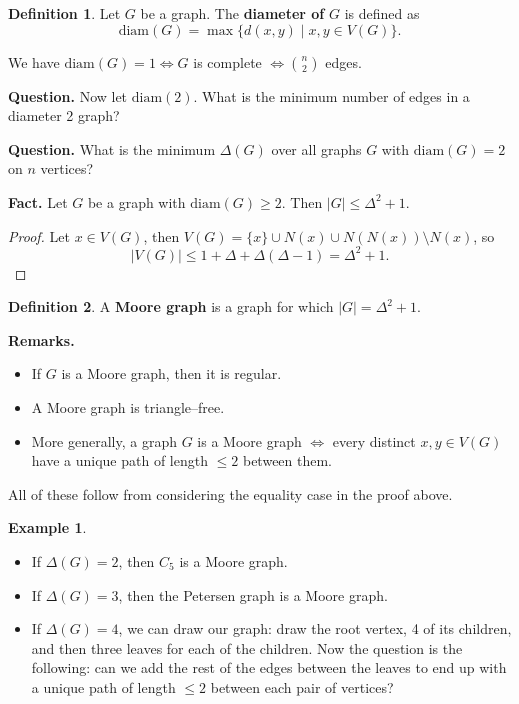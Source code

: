 \documentclass{article}
\theoremstyle{definition}
\newtheorem{example}{Example}[section]
\newtheorem{defn}{Definition}[section]
\begin{document}
\begin{defn}
    Let $G$ be a graph. The \textbf{diameter of} $G$ is defined as $$\text{diam}(G) = \max \{d(x,y) \mid x,y \in V(G)\}.$$ 
\end{defn}

We have $\text{diam}(G)=1 \iff G$ is complete $\iff {n\choose{2}}$ edges.
\vspace{1mm}

\textbf{Question.} Now let $\text{diam}(2)$. What is the minimum number of edges in a diameter 2 graph?
\vspace{1mm}

\textbf{Question.} What is the minimum $\Delta(G)$ over all graphs $G$ with $\text{diam}(G)=2$ on $n$ vertices?
\vspace{1mm}

\textbf{Fact.} Let $G$ be a graph with $\text{diam}(G)\ge 2$. Then $|G| \le \Delta^2+1$.
\begin{proof}
    Let $x \in V(G)$, then $V(G) = \{x\} \cup N(x) \cup N(N(x))\setminus N(x)$, so $$|V(G)| \le 1 + \Delta + \Delta(\Delta-1) = \Delta^2+1.$$
\end{proof}
\begin{defn}
    A \textbf{Moore graph} is a graph for which $|G|=\Delta^2+1$.
\end{defn}
\textbf{Remarks.}
\begin{itemize}
    \item If $G$ is a Moore graph, then it is regular.
    \item A Moore graph is triangle--free.
    \item More generally, a graph $G$ is a Moore graph $\iff$ every distinct $x,y \in V(G)$ have a unique path of length $\le 2$ between them. 
\end{itemize} 
All of these follow from considering the equality case in the proof above.
\begin{example}
    \begin{itemize}
        \item If $\Delta(G)=2$, then $C_5$ is a Moore graph.
        \item If $\Delta(G)=3$, then the Petersen graph is a Moore graph.
        \item If $\Delta(G)=4$, we can draw our graph: draw the root vertex, 4 of its children, and then three leaves for each of the children. Now the question is the following: can we add the rest of the edges between the leaves to end up with a unique path of length $\le 2$ between each pair of vertices? 
    \end{itemize}
\end{example}
\end{document}
